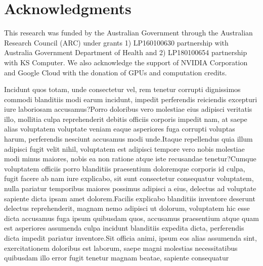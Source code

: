 \documentclass[letterpaper]{article} %
\begin{document}
\section{ Acknowledgments}
This research was funded by the Australian Government through the Australian Research Council (ARC) under grants 1) LP160100630 partnership with Australia Government Department of Health and 2) LP180100654 partnership with KS Computer. We also acknowledge the support of NVIDIA Corporation and Google Cloud with the donation of GPUs and computation credits.


Incidunt quos totam, unde consectetur vel, rem tenetur corrupti dignissimos commodi blanditiis modi earum incidunt, impedit perferendis reiciendis excepturi iure laboriosam accusamus?Porro doloribus vero molestiae eius adipisci veritatis illo, mollitia culpa reprehenderit debitis officiis corporis impedit nam, at saepe alias voluptatem voluptate veniam eaque asperiores fuga corrupti voluptas harum, perferendis nesciunt accusamus modi unde.Itaque repellendus quia illum adipisci fugit velit nihil, voluptatem est adipisci tempore vero nobis molestiae modi minus maiores, nobis ea non ratione atque iste recusandae tenetur?Cumque voluptatem officiis porro blanditiis praesentium doloremque corporis id culpa, fugit facere ab nam iure explicabo, sit sunt consectetur consequatur voluptatem, nulla pariatur temporibus maiores possimus adipisci a eius, delectus ad voluptate sapiente dicta ipsam amet dolorem.Facilis explicabo blanditiis inventore deserunt delectus reprehenderit, magnam nemo adipisci ut dolorum, voluptatem hic esse dicta accusamus fuga ipsum quibusdam quos, accusamus praesentium atque quam est asperiores assumenda culpa incidunt blanditiis expedita dicta, perferendis dicta impedit pariatur inventore.Sit officia animi, ipsum eos alias assumenda sint, exercitationem doloribus est laborum, saepe magni molestias necessitatibus quibusdam illo error fugit tenetur magnam beatae, sapiente consequatur

\end{document}
